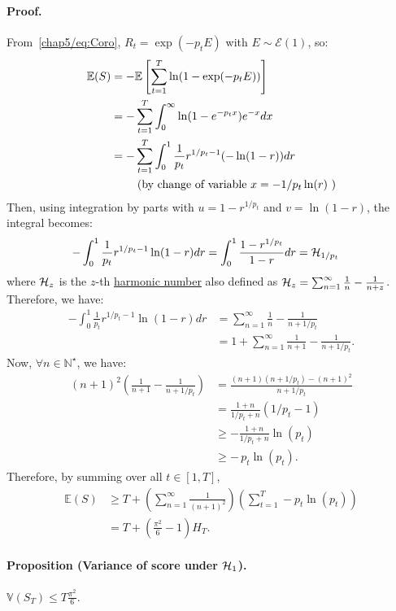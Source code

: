 \paragraph*{Proof.}
From~\eqref{chap5/eq:Coro}, $R_t=\exp(-p_t E)$ with $E\sim \mathcal{E}(1)$, so:
\begin{align*}
    \mathbb{E}(S) &= - \mathbb{E} \left[ \sum_{t=1}^T \ln (1-\exp(-p_t E)) \right] \\
    &= - \sum_{t=1}^T \int_0^\infty \ln (1-e^{-p_t x}) e^{-x} dx \\
    &= - \sum_{t=1}^T \int_0^1 \frac{1}{p_t} r^{1/p_t-1} (-\ln ( 1 - r)) dr  \\ 
    & \text{ \qquad (by change of variable $x = -1/p_t \ln (r) $ )} 
\end{align*}
Then, using integration by parts with $u = 1 - r^{1/p_t}$ and $v = \ln(1-r)$, the integral becomes:
\begin{align*}
    -\int_0^1 \frac{1}{p_t} r^{1/p_t-1} \ln ( 1 - r) dr &= \int_0^1 \frac{1-r^{1/p_t}}{1-r} dr = \mathcal{H}_{1/p_t}
\end{align*}
where $\mathcal{H}_{z}$ is the $z$-th \href{https://en.wikipedia.org/wiki/Harmonic_number}{harmonic number}
also defined as $\mathcal{H}_{z} = \sum_{n=1}^\infty \frac{1}{n} - \frac{1}{n+z}$.
Therefore, we have:
\begin{align*}
    -\int_0^1 \frac{1}{p_t} r^{1/p_t-1} \ln ( 1 - r) dr &= 
        \sum_{n=1}^\infty \frac{1}{n} - \frac{1}{n+1/p_t} \\
    &= 1 + \sum_{n=1}^\infty \frac{1}{n+1} - \frac{1}{n+1/p_t}.
\end{align*}
Now, $\forall n\in \mathbb{N^\star}$, we have:
\begin{align*}
   (n+1)^2 \left(\frac{1}{n+1} - \frac{1}{n+1/p_t}\right) &= \frac{(n+1)(n+1/p_t) - (n+1)^2}{n + 1/p_t} \\
    &=  \frac{1+n}{1/p_t + n} \left( 1/p_t -1\right) \\
    &\geq -  \frac{1+n}{1/p_t + n} \ln(p_t) \\
    &\geq -  \, p_t \ln(p_t).
\end{align*}
Therefore, by summing over all $t\in [1,T]$,
\begin{align*}
    \mathbb{E}(S) &\geq T +  \left(\sum_{n=1}^\infty \frac{1}{(n+1)^2}\right)\left(\sum_{t=1}^T- p_t\ln(p_t) \right) \\
    &=T +  \left( \frac{\pi^2}{6} -1 \right) H_T.
\end{align*}

\paragraph*{Proposition (Variance of score under $\mathcal{H}_1$).}
$\displaystyle\mathbb{V}(S_T)\leq T\frac{\pi^2}{6}$.

